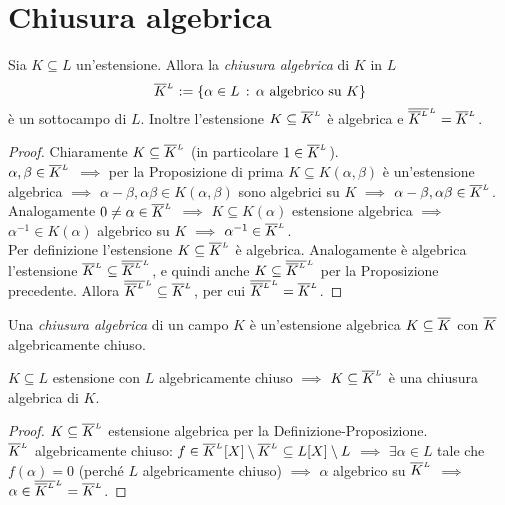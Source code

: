 
\section{Chiusura algebrica}


\begin{lemm}
Sia \(K\subseteq L\) un'estensione. Allora la {\em chiusura algebrica} di \(K\) in \(L\)
\[\calg[L]{K}:=\{\alpha\in L\st\text{\(\alpha\) algebrico su \(K\)}\}\]
è un sottocampo di \(L\). Inoltre l'estensione \(K\subseteq\calg[L]{K}\) è algebrica e \(\calg[L]{\calg[L]{K}}=\calg[L]{K}\).
\end{lemm}

\begin{proof}
Chiaramente \(K\subseteq\calg[L]{K}\) (in particolare \(1\in\calg[L]{K}\)). \\
\(\alpha,\beta\in\calg[L]{K}\) \(\implies\) per la Proposizione di prima \(K\subseteq K(\alpha,\beta)\) è un'estensione algebrica \(\implies\) \(\alpha-\beta,\alpha\beta\in K(\alpha,\beta)\) sono algebrici su \(K\) \(\implies\) \(\alpha-\beta,\alpha\beta\in\calg[L]{K}\). \\
Analogamente \(0\ne\alpha\in\calg[L]{K}\) \(\implies\) \(K\subseteq K(\alpha)\) estensione algebrica \(\implies\) \(\alpha^{-1}\in K(\alpha)\) algebrico su \(K\) \(\implies\) \(\alpha^{-1}\in\calg[L]{K}\). \\
Per definizione l'estensione \(K\subseteq\calg[L]{K}\) è algebrica. Analogamente è algebrica l'estensione \(\calg[L]{K}\subseteq\calg[L]{\calg[L]{K}}\), e quindi anche \(K\subseteq\calg[L]{\calg[L]{K}}\) per la Proposizione precedente. Allora \(\calg[L]{\calg[L]{K}}\subseteq\calg[L]{K}\), per cui \(\calg[L]{\calg[L]{K}}=\calg[L]{K}\).
\end{proof}

\begin{defi}
Una {\em chiusura algebrica} di un campo \(K\) è un'estensione algebrica \(K \subseteq \calg{K}\) con \(\calg{K}\) algebricamente chiuso.
\end{defi}

\begin{coro}
\(K\subseteq L\) estensione con \(L\) algebricamente chiuso \(\implies\) \(K\subseteq\calg[L]{K}\) è una chiusura algebrica di \(K\).
\end{coro}

\begin{proof}
\(K\subseteq\calg[L]{K}\) estensione algebrica per la Definizione-Proposizione. \\
\(\calg[L]{K}\) algebricamente chiuso: \(f\in\calg[L]{K}[X]\setminus\calg[L]{K}\subseteq L[X]\setminus L\) \(\implies\) \(\exi\alpha\in L\) tale che \(f(\alpha)=0\) (perché \(L\) algebricamente chiuso) \(\implies\) \(\alpha\) algebrico su \(\calg[L]{K}\) \(\implies\) \(\alpha\in\calg[L]{\calg[L]{K}}=\calg[L]{K}\).  
\end{proof}

